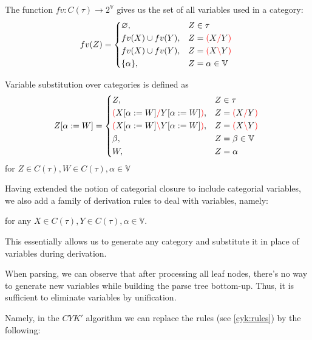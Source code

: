 \documentclass[main.tex]{subfiles}
\begin{document}
\begin{defn}
    The function $fv: C(\tau) \rightarrow 2^{\mathbb{V}}$ gives us the set of
    all variables used in a category:
    \[
        fv(Z) =
        \begin{cases*}
            \varnothing, & $Z \in \tau$ \\
            fv(X) \cup fv(Y), & $Z = \lp X \rc Y \rp$ \\
            fv(X) \cup fv(Y), & $Z = \lp X \lc Y \rp$ \\
            \{ \alpha \}, & $Z = \alpha \in \mathbb{V}$ \\
        \end{cases*}
    \]
\end{defn}
\begin{defn}
    Variable substitution over categories is defined as
    \[
        \subst{Z}{\alpha}{W} =
        \begin{cases*}
            Z, & $Z \in \tau$ \\
            \lp \subst{X}{\alpha}{W} \rc \subst{Y}{\alpha}{W} \rp, & $Z = \lp X \rc Y \rp$ \\
            \lp \subst{X}{\alpha}{W} \lc \subst{Y}{\alpha}{W} \rp, & $Z = \lp X \lc Y \rp$ \\
            \beta, & $Z = \beta \in \mathbb{V}$ \\
            W, & $Z = \alpha$ \\
        \end{cases*}
    \]
    for $Z \in C(\tau), W \in C(\tau), \alpha \in \mathbb{V}$
\end{defn}

Having extended the notion of categorial closure to include categorial variables,
we also add a family of derivation rules to deal with variables, namely:
\begin{center}
\end{center}
for any $X \in C(\tau), Y \in C(\tau), \alpha \in \mathbb{V}$.

This essentially allows us to generate any category and substitute it in place
of variables during derivation.

When parsing, we can observe that after processing all leaf nodes,
there's no way to generate new variables while building the parse tree
bottom-up. Thus, it is sufficient to eliminate variables by unification.

Namely, in the $CYK'$ algorithm we can replace the rules (see \ref{cyk:rules})
by the following:
\end{document}
